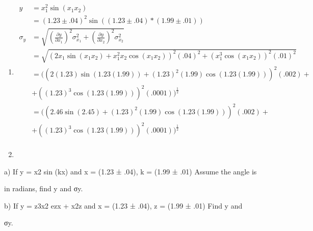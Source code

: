 \documentclass{article}
\begin{document}
\begin{enumerate}
\begin{enumerate}
\item
\begin{align*}
y &= x_{1}^2\sin(x_{1}x_{2})\\
&= (1.23 \pm .04)^2\sin((1.23 \pm .04) * (1.99 \pm .01))\\
\sigma_{y} &= \sqrt{(\frac{\partial y}{\partial x_{1}})^2\sigma_{x_{1}}^2 + (\frac{\partial y}{\partial x_{2}})^2\sigma_{x_{2}}^2}\\
&= \sqrt{(2x_{1}\sin(x_{1}x_{2}) + x_{1}^2x_{2}\cos(x_{1}x_{2}))^2(.04)^2 + (x_{1}^3\cos(x_{1}x_{2}))^2(.01)^2}\\
&= ((2(1.23)\sin(1.23(1.99)) + (1.23)^2(1.99)\cos(1.23(1.99)))^2(.002) +\\
&+ ((1.23)^3\cos(1.23(1.99)))^2(.0001))^\frac{1}{2}\\
&= ((2.46\sin(2.45) + (1.23)^2(1.99)\cos(1.23(1.99)))^2(.002) +\\&+ ((1.23)^3\cos(1.23(1.99)))^2(.0001))^\frac{1}{2}\\
\end{align*}
\item
\end{enumerate}
\end{enumerate}


a) If y = x2 sin (kx) and x = (1.23 ± .04), k = (1.99 ± .01) Assume the angle is 

in radians, find y and σy. 

b) If y = z3x2 ezx + x2z and x = (1.23 ± .04), z = (1.99 ± .01) Find y and 

σy.
\end{document}
